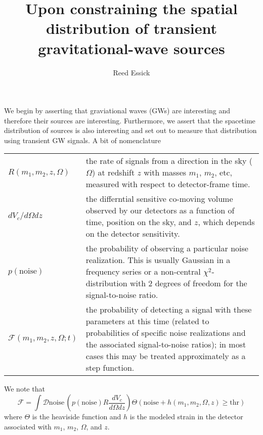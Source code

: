 \documentclass{article}
\begin{document}
\title{
Upon constraining the spatial distribution of transient gravitational-wave sources
}

\author{
Reed Essick
}

\maketitle


\doublespace

We begin by asserting that graviational waves (GWs) are interesting and therefore their sources are interesting.
Furthermore, we assert that the spacetime distribution of sources is also interesting and set out to measure that distribution using transient GW signals.
A bit of nomenclature

\vspace{0.5cm}
\begin{tabular}{p{3cm}p{12cm}}
    $R(m_1, m_2, z, \Omega)$ & the rate of signals from a direction in the sky ($\Omega$) at redshift $z$ with masses $m_1$, $m_2$, etc, measured with respect to detector-frame time. \\
    $dV_c/d\Omega dz$ & the differntial sensitive co-moving volume observed by our detectors as a function of time, position on the sky, and $z$, which depends on the detector sensitivity. \\
    $p(\mathrm{noise})$ & the probability of observing a particular noise realization. This is usually Gaussian in a frequency series or a non-central $\chi^2$-distribution with 2 degrees of freedom for the signal-to-noise ratio. \\
    $\mathcal{F}(m_1,m_2,z,\Omega;t) $ & the probability of detecting a signal with these parameters at this time (related to probabilities of specific noise realizations and the associated signal-to-noise ratios); in most cases this may be treated approximately as a step function.
\end{tabular}
We note that 
\begin{equation}
    \mathcal{F} = \int \mathcal{D}\mathrm{noise}\, \left(p(\mathrm{noise}) R\frac{dV_c}{d\Omega dz}\right) \Theta\left(\mathrm{noise}+h(m_1, m_2, \Omega, z)\geq \mathrm{thr}\right)
\end{equation}
where $\Theta$ is the heaviside function and $h$ is the modeled strain in the detector associated with $m_1$, $m_2$, $\Omega$, and $z$.
\end{document}
